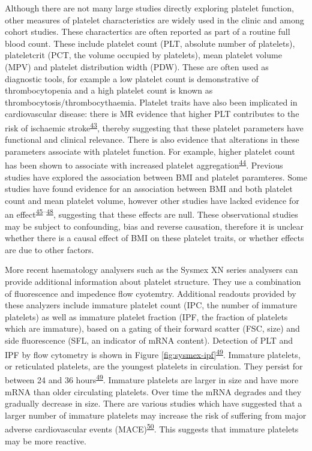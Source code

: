 \documentclass[11pt,twoside]{bristolthesis}
\begin{document}
Although there are not many large studies directly exploring platelet function, other measures of platelet characteristics are widely used in the clinic and among cohort studies. These charactertics are often reported as part of a routine full blood count. These include platelet count (PLT, absolute number of platelets), plateletcrit (PCT, the volume occupied by platelets), mean platelet volume (MPV) and platelet distribution width (PDW). These are often used as diagnostic tools, for example a low platelet count is demonstrative of thrombocytopenia and a high platelet count is known as thrombocytosis/thrombocythaemia. Platelet traits have also been implicated in cardiovascular disease: there is MR evidence that higher PLT contributes to the risk of ischaemic stroke\textsuperscript{\protect\hyperlink{ref-Gill2018}{43}}, thereby suggesting that these platelet parameters have functional and clinical relevance. There is also evidence that alterations in these parameters associate with platelet function. For example, higher platelet count has been shown to associate with increased platelet aggregation\textsuperscript{\protect\hyperlink{ref-Wurtz2012}{44}}. Previous studies have explored the association between BMI and platelet paramteres. Some studies have found evidence for an association between BMI and both platelet count and mean platelet volume, however other studies have lacked evidence for an effect\textsuperscript{\protect\hyperlink{ref-Furuncuoglu2016}{45}--\protect\hyperlink{ref-Heffron2018}{48}}, suggesting that these effects are null. These observational studies may be subject to confounding, bias and reverse causation, therefore it is unclear whether there is a causal effect of BMI on these platelet traits, or whether effects are due to other factors.

More recent haematology analysers such as the Sysmex XN series analysers can provide additional information about platelet structure. They use a combination of fluorescence and impedence flow cyotemtry. Additional readouts provided by these analyzers include immature platelet count (IPC, the number of immature platelets) as well as immature platelet fraction (IPF, the fraction of platelets which are immature), based on a gating of their forward scatter (FSC, size) and side fluorescence (SFL, an indicator of mRNA content). Detection of PLT and IPF by flow cytometry is shown in Figure \ref{fig:sysmex-ipf}\textsuperscript{\protect\hyperlink{ref-Corpataux2020}{49}}. Immature platelets, or reticulated platelets, are the youngest platelets in circulation. They persist for between 24 and 36 hours\textsuperscript{\protect\hyperlink{ref-Corpataux2020}{49}}. Immature platelets are larger in size and have more mRNA than older circulating platelets. Over time the mRNA degrades and they gradually decrease in size. There are various studies which have suggested that a larger number of immature platelets may increase the risk of suffering from major adverse cardiovascular events (MACE)\textsuperscript{\protect\hyperlink{ref-Ibrahim2014}{50}}. This suggests that immature platelets may be more reactive.
\end{document}
